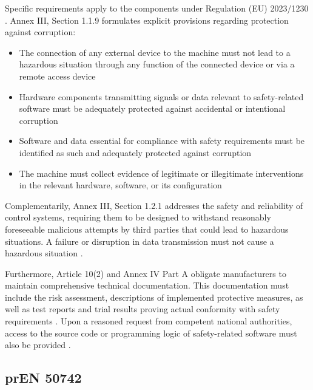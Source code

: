 Specific requirements apply to the components under Regulation (EU) 2023/1230 \cite[pp. 44]{EU2023_1230}. Annex III, Section 1.1.9 formulates explicit provisions regarding protection against corruption:
\begin{itemize}
	\item The connection of any external device to the machine must not lead to a hazardous situation through any function of the connected device or via a remote access device \cite[p. 48]{EU2023_1230}
	\item Hardware components transmitting signals or data relevant to safety-related software must be adequately protected against accidental or intentional corruption 
	\item Software and data essential for compliance with safety requirements must be identified as such and adequately protected against corruption
	\item The machine must collect evidence of legitimate or illegitimate interventions in the relevant hardware, software, or its configuration \cite[p. 49]{EU2023_1230}
\end{itemize}

Complementarily, Annex III, Section 1.2.1 addresses the safety and reliability of control systems, requiring them to be designed to withstand reasonably foreseeable malicious attempts by third parties that could lead to hazardous situations. A failure or disruption in data transmission must not cause a hazardous situation \cite[p. 49]{EU2023_1230}.

Furthermore, Article 10(2) \cite[p. 18]{EU2023_1230} and Annex IV Part A \cite[p. 83 f]{EU2023_1230} obligate manufacturers to maintain comprehensive technical documentation. This documentation must include the risk assessment, descriptions of implemented protective measures, as well as test reports and trial results proving actual conformity with safety requirements \cite[p. 83]{EU2023_1230}. Upon a reasoned request from competent national authorities, access to the source code or programming logic of safety-related software must also be provided \cite[p. 84]{EU2023_1230}.


\subsection{prEN 50742} 
\label{subsec:pren_50742} 

